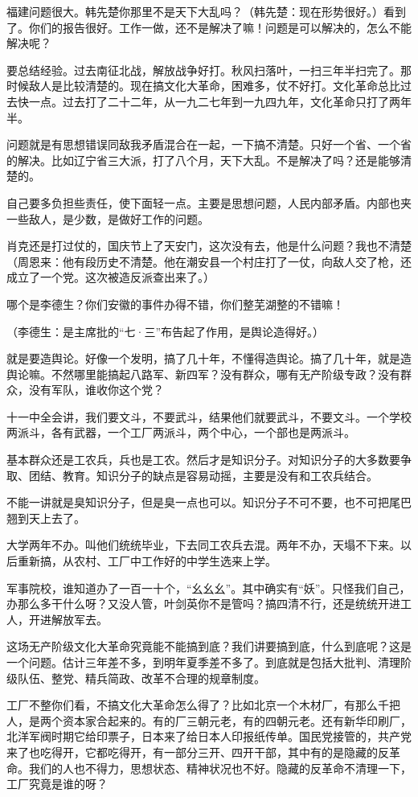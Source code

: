 福建问题很大。韩先楚你那里不是天下大乱吗？（韩先楚：现在形势很好。）看到了。你们的报告很好。工作一做，还不是解决了嘛！问题是可以解决的，怎么不能解决呢？

要总结经验。过去南征北战，解放战争好打。秋风扫落叶，一扫三年半扫完了。那时候敌人是比较清楚的。现在搞文化大革命，困难多，仗不好打。文化革命总比过去快一点。过去打了二十二年，从一九二七年到一九四九年，文化革命只打了两年半。

问题就是有思想错误同敌我矛盾混合在一起，一下搞不清楚。只好一个省、一个省的解决。比如辽宁省三大派，打了八个月，天下大乱。不是解决了吗？还是能够清楚的。

自己要多负担些责任，使下面轻一点。主要是思想问题，人民内部矛盾。内部也夹一些敌人，是少数，是做好工作的问题。

肖克还是打过仗的，国庆节上了天安门，这次没有去，他是什么问题？我也不清楚（周恩来：他有段历史不清楚。他在潮安县一个村庄打了一仗，向敌人交了枪，还成立了一个党。这次被造反派查出来了。）

哪个是李德生？你们安徽的事件办得不错，你们整芜湖整的不错嘛！

（李德生：是主席批的“七·三”布告起了作用，是舆论造得好。）

就是要造舆论。好像一个发明，搞了几十年，不懂得造舆论。搞了几十年，就是造舆论嘛。不然哪里能搞起八路军、新四军？没有群众，哪有无产阶级专政？没有群众，没有军队，谁收你这个党？

十一中全会讲，我们要文斗，不要武斗，结果他们就要武斗，不要文斗。一个学校两派斗，各有武器，一个工厂两派斗，两个中心，一个部也是两派斗。

基本群众还是工农兵，兵也是工农。然后才是知识分子。对知识分子的大多数要争取、团结、教育。知识分子的缺点是容易动摇，主要是没有和工农兵结合。

不能一讲就是臭知识分子，但是臭一点也可以。知识分子不可不要，也不可把尾巴翘到天上去了。

大学两年不办。叫他们统统毕业，下去同工农兵去混。两年不办，天塌不下来。以后重新搞，从农村、工厂中工作好的中学生选来上学。

军事院校，谁知道办了一百一十个，“幺幺幺”。其中确实有“妖”。只怪我们自己，办那么多干什么呀？又没人管，叶剑英你不是管吗？搞四清不行，还是统统开进工人，开进解放军去。

这场无产阶级文化大革命究竟能不能搞到底？我们讲要搞到底，什么到底呢？这是一个问题。估计三年差不多，到明年夏季差不多了。到底就是包括大批判、清理阶级队伍、整党、精兵简政、改革不合理的规章制度。

工厂不整你们看，不搞文化大革命怎么得了？比如北京一个木材厂，有那么千把人，是两个资本家合起来的。有的厂三朝元老，有的四朝元老。还有新华印刷厂，北洋军阀时期它给印票子，日本来了给日本人印报纸传单。国民党接管的，共产党来了也吃得开，它都吃得开，有一部分三开、四开干部，其中有的是隐藏的反革命。我们的人也不得力，思想状态、精神状况也不好。隐藏的反革命不清理一下，工厂究竟是谁的呀？

